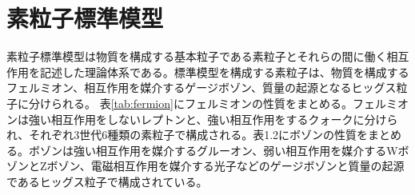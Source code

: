 \section{素粒子標準模型}
\label{sec_intro_sm}
素粒子標準模型は物質を構成する基本粒子である素粒子とそれらの間に働く相互作用を記述した理論体系である。標準模型を構成する素粒子は、物質を構成するフェルミオン、相互作用を媒介するゲージボゾン、質量の起源となるヒッグス粒子に分けられる。
表\ref{tab:fermion}にフェルミオンの性質をまとめる。フェルミオンは強い相互作用をしないレプトンと、強い相互作用をするクォークに分けられ、それぞれ3世代6種類の素粒子で構成される。表1.2にボゾンの性質をまとめる。ボゾンは強い相互作用を媒介するグルーオン、弱い相互作用を媒介するWボゾンとZボゾン、電磁相互作用を媒介する光子などのゲージボゾンと質量の起源であるヒッグス粒子で構成されている。

